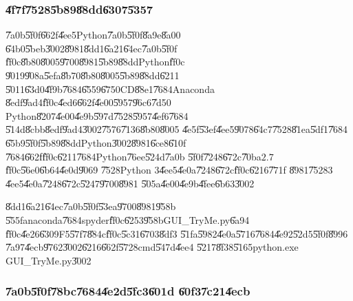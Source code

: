 \subsubsection{\U{4f7f}\U{7528}\U{5b89}\U{88dd}\U{6307}\U{5357}}

\U{7a0b}\U{5f0f}\U{662f}\U{4ee5}Python\U{7a0b}\U{5f0f}\U{8a9e}\U{8a00}%
\U{64b0}\U{5beb}\U{3002}\U{8981}\U{8dd1}\U{6a21}\U{64ec}\U{7a0b}\U{5f0f}%
\U{ff0c}\U{8b80}\U{8005}\U{9700}\U{8981}\U{5b89}\U{88dd}Python\U{ff0c}%
\U{9019}\U{908a}\U{5efa}\U{8b70}\U{8b80}\U{8005}\U{5b89}\U{88dd}\U{6211}%
\U{5011}\U{63d0}\U{4f9b}\U{7684}\U{6559}\U{6750}CD\U{88e1}\U{7684}Anaconda%
\U{8edf}\U{9ad4}\U{ff0c}\U{4ed6}\U{662f}\U{4e00}\U{5957}\U{96c6}\U{7d50}%
Python\U{8207}\U{4e00}\U{4e9b}\U{597d}\U{7528}\U{5957}\U{4ef6}\U{7684}%
\U{514d}\U{8cbb}\U{8edf}\U{9ad4}\U{3002}\U{7576}\U{7136}\U{8b80}\U{8005}%
\U{4e5f}\U{53ef}\U{4ee5}\U{9078}\U{64c7}\U{7528}\U{81ea}\U{5df1}\U{7684}%
\U{65b9}\U{5f0f}\U{5b89}\U{88dd}Python\U{3002}\U{8981}\U{6ce8}\U{610f}%
\U{7684}\U{662f}\U{ff0c}\U{6211}\U{7684}Python\U{76ee}\U{524d}\U{7a0b}%
\U{5f0f}\U{7248}\U{672c}\U{70ba}$2.7$\U{ff0c}\U{56e0}\U{6b64}\U{4e0d}\U{9069}%
\U{7528}Python $3$\U{4ee5}\U{4e0a}\U{7248}\U{672c}\U{ff0c}\U{6216}\U{771f}%
\U{8981}\U{7528}$3$\U{4ee5}\U{4e0a}\U{7248}\U{672c}\U{5247}\U{9700}\U{8981}%
\U{505a}\U{4e00}\U{4e9b}\U{4fee}\U{6b63}\U{3002}

\U{8dd1}\U{6a21}\U{64ec}\U{7a0b}\U{5f0f}\U{53ea}\U{9700}\U{8981}\U{958b}%
\U{555f}anaconda\U{7684}spyder\U{ff0c}\U{6253}\U{958b}GUI\_TryMe.py\U{6a94}%
\U{ff0c}\U{4e26}\U{6309}F5\U{57f7}\U{884c}\U{ff0c}\U{5c31}\U{6703}\U{8df3}%
\U{51fa}\U{5982}\U{4e0a}\U{5716}\U{7684}\U{4e92}\U{52d5}\U{5f0f}\U{8996}%
\U{7a97}\U{4ecb}\U{9762}\U{3002}\U{6216}\U{662f}\U{5728}cmd\U{547d}\U{4ee4}%
\U{5217}\U{8f38}\U{5165}python.exe GUI\_TryMe.py\U{3002}

\subsubsection{\U{7a0b}\U{5f0f}\U{78bc}\U{7684}\U{4e2d}\U{5fc3}\U{601d}%
\U{60f3}\U{7c21}\U{4ecb}}

